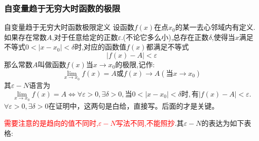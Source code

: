 \documentclass[12pt, a4paper, oneside, UTF8]{ctexbook}  %
\begin{document}
\begin{sloppypar}
    \subsubsection{自变量趋于无穷大时函数的极限}
    \begin{defn}{自变量趋于无穷大时函数极限定义}{}
        设函数$f(x)$在点$x_0$的某一去心邻域内有定义.如果存在常数$A$,对于任意给定的正数$\varepsilon$.(不论它多么小),总存在正数$\delta$,使得当$x$满足不等式$0<|x-x_0|<\delta$时,对应的函数值$f(x)$都满足不等式
        $$
            |f(x)-A|<\varepsilon
        $$
        那么常数$A$叫做函数$f(x)$当$x \to x_0$的极限,记作:
        $$
            \lim_{x\to x_0}f(x)=A\text{或}f(x)\to A(\text{当}x\to x_0)
        $$
        其$\varepsilon-N$语言为
        $$
            \lim\limits_{x\to x_0}f(x)=A\Leftrightarrow\forall\varepsilon>0,\exists\delta>0,\text{当}0<|x-x_0|<\delta\text{时},\text{有}|f(x)-A|<\varepsilon.
        $$
        $\forall\varepsilon>0,\exists\delta>0$在证明中，这两句是白给，直接写。后面的才是关键。
    \end{defn}
    \textcolor{red}{需要注意的是趋向的值不同时,$\varepsilon -N$写法不同,不能照抄}.其$\varepsilon -N$的表达为如下表格:
    \begin{center}
        \tabletail{
            \hline
        }
        \begin{supertabular}{|c|c|c|c|c|}
            \hline

\end{supertabular}
\end{center}
\end{sloppypar}
\end{document}
